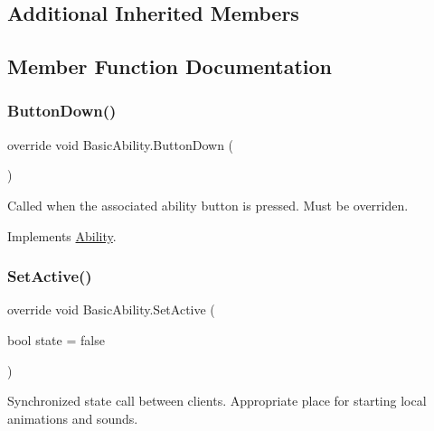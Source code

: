 \subsection*{Additional Inherited Members}


\subsection{Member Function Documentation}
\hypertarget{class_basic_ability_aec13c3d43d6690106f150026c59b63f0}{}\label{class_basic_ability_aec13c3d43d6690106f150026c59b63f0} 
\subsubsection{\texorpdfstring{Button\+Down()}{ButtonDown()}}
{\footnotesize\ttfamily override void Basic\+Ability.\+Button\+Down (\begin{DoxyParamCaption}{ }\end{DoxyParamCaption})\hspace{0.3cm}{\ttfamily [virtual]}}



Called when the associated ability button is pressed. Must be overriden. 



Implements \hyperlink{class_ability_a7722265862f8b29828315725415ce266}{Ability}.

\hypertarget{class_basic_ability_a5aa77734c675136e256cab6ba16b850a}{}\label{class_basic_ability_a5aa77734c675136e256cab6ba16b850a} 
\subsubsection{\texorpdfstring{Set\+Active()}{SetActive()}}
{\footnotesize\ttfamily override void Basic\+Ability.\+Set\+Active (\begin{DoxyParamCaption}\item[{bool}]{state = {\ttfamily false} }\end{DoxyParamCaption})\hspace{0.3cm}{\ttfamily [virtual]}}



Synchronized state call between clients. Appropriate place for starting local animations and sounds. 



